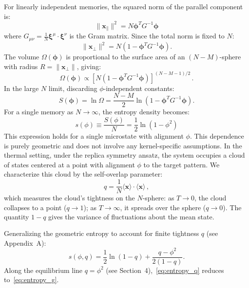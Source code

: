 \documentclass{article}
\theoremstyle{plain}
\theoremstyle{definition}
\theoremstyle{remark}
\begin{document}
For linearly independent memories, the squared norm of the parallel component is:
\begin{equation}
    \|\mathbf{x}_{\parallel}\|^2 = N \bm{\phi}^T G^{-1} \bm{\phi}
\end{equation}
where $G_{\mu\nu} = \frac{1}{N} \bm{\xi}^\mu \cdot \bm{\xi}^\nu$ is the Gram matrix. Since the total norm is fixed to $N$:
\begin{equation}
    \|\mathbf{x}_{\perp}\|^2 = N \left( 1 - \bm{\phi}^T G^{-1} \bm{\phi} \right).
\end{equation}
The volume $\Omega(\bm{\phi})$ is proportional to the surface area of an $(N-M)$-sphere with radius $R = \|\mathbf{x}_{\perp}\|$, giving:
\begin{equation}
    \Omega(\bm{\phi}) \propto \left[ N \left( 1 - \bm{\phi}^T G^{-1} \bm{\phi} \right) \right]^{(N-M-1)/2}\,.
\end{equation}
In the large $N$ limit, discarding $\phi$-independent constants:
\begin{equation}
    S(\bm{\phi}) = \ln \Omega = \frac{N-M}{2} \ln \left( 1 - \bm{\phi}^T G^{-1} \bm{\phi} \right).
\end{equation}
For a single memory as $N \to \infty$, the entropy density becomes:
\begin{equation}
    s(\phi) \equiv \frac{S(\phi)}{N} = \frac{1}{2} \ln ( 1 - \phi^2 )
	\label{eq:entropy_g}
\end{equation}
This expression holds for a single microstate with alignment $\phi$. This dependence is purely geometric and does not involve any kernel-specific assumptions.
In the thermal setting, under the replica symmetry ansatz, the system occupies a cloud of states centered at a point with alignment $\phi$ to the target pattern. We characterize this cloud by the self-overlap parameter:
\begin{equation}
    q = \frac{1}{N} \langle \bm{x} \rangle \cdot \langle \bm{x} \rangle\,,
\end{equation}
which measures the cloud's tightness on the $N$-sphere: as $T \to 0$, the cloud collapses to a point ($q \to 1$); as $T \to \infty$, it spreads over the sphere ($q \to 0$). The quantity $1-q$ gives the variance of fluctuations about the mean state.

Generalizing the geometric entropy to account for finite tightness $q$ (see Appendix~A):
\begin{equation}
    s(\phi, q) = \frac{1}{2} \ln(1-q) + \frac{q - \phi^2}{2(1-q)}.
	\label{eq:entropy_q}
\end{equation}
Along the equilibrium line $q = \phi^2$ (see Section~4),~\eqref{eq:entropy_q} reduces to~\eqref{eq:entropy_g}.
\end{document}
